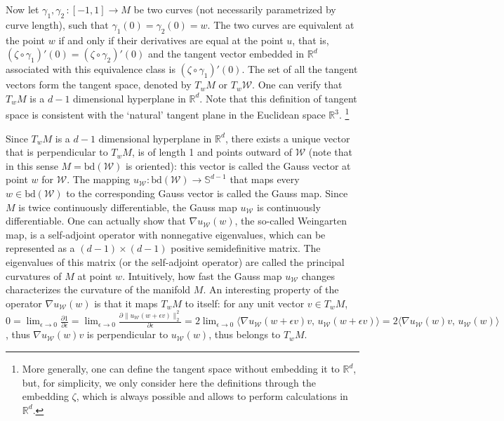 \documentclass[english]{article}
\newcommand{\cW}{\mathcal{W}}
\newcommand{\real}{\mathbb{R}}
\newcommand{\R}{\mathbb{R}}
\newcommand{\bS}{\mathbb{S}}
\newcommand{\bd}{\mathrm{bd}}
\begin{document}
Now let $\gamma_1,\gamma_2\,: [-1,1] \rightarrow M$ be two curves (not necessarily parametrized by curve length),  such that $\gamma_1(0) = \gamma_2(0)=w$. The two curves are equivalent at the point $w$ if and only if their derivatives are equal at the point $u$, that is, $(\zeta\circ\gamma_1)'(0) = (\zeta\circ\gamma_2)'(0)$ and the tangent vector embedded in $\real^d$ associated with this equivalence class is $(\zeta\circ\gamma_1)'(0)$. The set of all the tangent vectors form the tangent space, denoted by $T_{w}M$ or $T_w \cW$. 
One can verify that $T_wM$ is a $d-1$ dimensional hyperplane in $\real^d$. Note that this definition of tangent space is consistent with the `natural' tangent plane in the Euclidean space $\real^3$.%
\footnote{More generally, one can define the tangent space without embedding it to $\real^d$, but, for simplicity, we only consider here the definitions through the embedding $\zeta$, which is always possible and allows to perform calculations in $\real^d$.}

Since $T_w M$ is a $d-1$ dimensional hyperplane in $\real^d$, there exists a unique vector that is perpendicular to $T_wM$, is of length 1 and points outward of $\cW$ (note that in this sense $M=\bd(\cW)$ is oriented): this vector is called the Gauss vector at point $w$ for $\cW$. The mapping $u_{\cW}:\bd(\cW) \rightarrow \bS^{d-1}$ that maps every $w\in \bd(\cW)$ to the corresponding Gauss vector is called the Gauss map. Since $M$ is twice continuously differentiable, the Gauss map $u_{\cW}$ is continuously differentiable.
One can actually show that $\nabla u_{\cW}(w)$, the so-called Weingarten map, is a self-adjoint operator with nonnegative eigenvalues, which can be represented as a $(d-1)\times (d-1)$ positive semidefinitive matrix.
The eigenvalues of this matrix (or the self-adjoint operator) are called the principal curvatures of $M$ at point $w$. Intuitively, how fast the Gauss map $u_{\cW}$ changes characterizes the curvature of the manifold $M$. An interesting property of the operator $\nabla u_{\cW}(w)$ is that it maps $T_w M$ to itself: for any unit vector $v\in T_wM$, $0 = \lim_{\epsilon\rightarrow 0} \frac{\partial 1}{\partial \epsilon} = \lim_{\epsilon\rightarrow 0}\frac{\partial \|u_{\cW}(w+\epsilon v)\|_2^2}{\partial \epsilon} = 2\lim_{\epsilon\rightarrow 0}\langle \nabla u_{\cW}(w+\epsilon v)v,\, u_{\cW}(w+\epsilon v)\rangle = 2\langle \nabla u_{\cW}(w)v,\, u_{\cW}(w)\rangle$ , thus $\nabla u_{\cW}(w)v$ is perpendicular to $u_{\cW}(w)$, thus belongs to $T_wM$.
\end{document}
